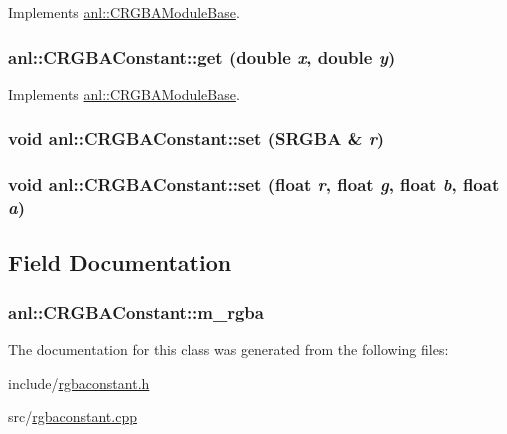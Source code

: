 Implements \hyperlink{classanl_1_1CRGBAModuleBase_a097897c2d625c824832325260169c90e}{anl::CRGBAModuleBase}.\hypertarget{classanl_1_1CRGBAConstant_a2b2d721d125057ef64b73c8991f9cdf2}{
\subsubsection[{get}]{ anl::CRGBAConstant::get (double {\em x}, \/  double {\em y})}}
\label{classanl_1_1CRGBAConstant_a2b2d721d125057ef64b73c8991f9cdf2}


Implements \hyperlink{classanl_1_1CRGBAModuleBase_afb6896d38ae92b9bb784fe5dc731ae67}{anl::CRGBAModuleBase}.\hypertarget{classanl_1_1CRGBAConstant_a4b565c67f527c909faace9c7d407ff19}{
\subsubsection[{set}]{\setlength{\rightskip}{0pt plus 5cm}void anl::CRGBAConstant::set ({\bf SRGBA} \& {\em r})}}
\label{classanl_1_1CRGBAConstant_a4b565c67f527c909faace9c7d407ff19}
\hypertarget{classanl_1_1CRGBAConstant_a77b89eb3a59e01b2a72c8eca7e35dc43}{
\subsubsection[{set}]{\setlength{\rightskip}{0pt plus 5cm}void anl::CRGBAConstant::set (float {\em r}, \/  float {\em g}, \/  float {\em b}, \/  float {\em a})}}
\label{classanl_1_1CRGBAConstant_a77b89eb3a59e01b2a72c8eca7e35dc43}


\subsection{Field Documentation}
\hypertarget{classanl_1_1CRGBAConstant_a0f6ae18a9215b83112c57f9081d8c432}{
\subsubsection[{m\_\-rgba}]{ {\bf anl::CRGBAConstant::m\_\-rgba}}}
\label{classanl_1_1CRGBAConstant_a0f6ae18a9215b83112c57f9081d8c432}


The documentation for this class was generated from the following files:\begin{DoxyCompactItemize}
\item 
include/\hyperlink{rgbaconstant_8h}{rgbaconstant.h}\item 
src/\hyperlink{rgbaconstant_8cpp}{rgbaconstant.cpp}\end{DoxyCompactItemize}
